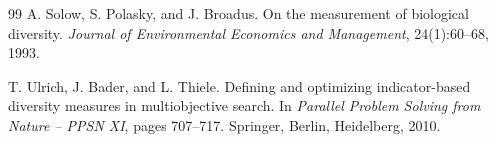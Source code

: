 \documentclass[12pt,a4paper]{article}
\begin{document}
\begin{thebibliography}{99}
A. Solow, S. Polasky, and J. Broadus.
\newblock On the measurement of biological diversity.
\newblock \emph{Journal of Environmental Economics and Management}, 24(1):60--68, 1993.

T. Ulrich, J. Bader, and L. Thiele.
\newblock Defining and optimizing indicator-based diversity measures in multiobjective search.
\newblock In \emph{Parallel Problem Solving from Nature -- PPSN XI}, pages 707--717.
\newblock Springer, Berlin, Heidelberg, 2010.

\end{thebibliography}
\end{document}
